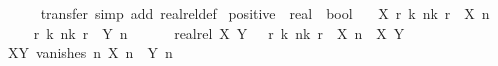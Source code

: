 \begin{isabellebody}
\ \ \ \ \isamarkupfalse%
\ transfer\ {\isacharparenleft}{\kern0pt}simp\ add{\isacharcolon}{\kern0pt}\ realrel{\isacharunderscore}{\kern0pt}def{\isacharparenright}{\kern0pt}\isanewline
{}\isamarkupfalse%
%
\endisatagproof
{\isafoldproof}%
%
\isadelimproof
\isanewline
%
\endisadelimproof
\isanewline
{}\isamarkupfalse%
%
\isadelimdocument
%
\endisadelimdocument
%
\isatagdocument
%
\isamarkuptrue%
%
\endisatagdocument
{\isafolddocument}%
%
\isadelimdocument
%
\endisadelimdocument
{}\isamarkupfalse%
\ positive\ {\isacharcolon}{\kern0pt}{\isacharcolon}{\kern0pt}\ {\isachardoublequoteopen}real\ {\isasymRightarrow}\ bool{\isachardoublequoteclose}\isanewline
\ \ \ {\isachardoublequoteopen}{\isasymlambda}X{\isachardot}{\kern0pt}\ {\isasymexists}r{\isachargreater}{\kern0pt}{}{\isachardot}{\kern0pt}\ {\isasymexists}k{\isachardot}{\kern0pt}\ {\isasymforall}n{\isasymge}k{\isachardot}{\kern0pt}\ r\ {\isacharless}{\kern0pt}\ X\ n{\isachardoublequoteclose}\isanewline
%
\isadelimproof
%
\endisadelimproof
%
\isatagproof
{}\isamarkupfalse%
\ {\isacharminus}{\kern0pt}\isanewline
\ \ \isamarkupfalse%
\ {}{\isacharcolon}{\kern0pt}\ {\isachardoublequoteopen}{\isasymexists}r{\isachargreater}{\kern0pt}{}{\isachardot}{\kern0pt}\ {\isasymexists}k{\isachardot}{\kern0pt}\ {\isasymforall}n{\isasymge}k{\isachardot}{\kern0pt}\ r\ {\isacharless}{\kern0pt}\ Y\ n{\isachardoublequoteclose}\isanewline
\ \ \ \ \ {\isacharasterisk}{\kern0pt}{\isacharcolon}{\kern0pt}\ {\isachardoublequoteopen}realrel\ X\ Y{\isachardoublequoteclose}\ \ {\isacharasterisk}{\kern0pt}{\isacharasterisk}{\kern0pt}{\isacharcolon}{\kern0pt}\ {\isachardoublequoteopen}{\isasymexists}r{\isachargreater}{\kern0pt}{}{\isachardot}{\kern0pt}\ {\isasymexists}k{\isachardot}{\kern0pt}\ {\isasymforall}n{\isasymge}k{\isachardot}{\kern0pt}\ r\ {\isacharless}{\kern0pt}\ X\ n{\isachardoublequoteclose}\ \ X\ Y\isanewline
\ \ \isamarkupfalse%
\ {\isacharminus}{\kern0pt}\isanewline
\ \ \ \ \isamarkupfalse%
\ {\isacharasterisk}{\kern0pt}\ \isamarkupfalse%
\ XY{\isacharcolon}{\kern0pt}\ {\isachardoublequoteopen}vanishes\ {\isacharparenleft}{\kern0pt}{\isasymlambda}n{\isachardot}{\kern0pt}\ X\ n\ {\isacharminus}{\kern0pt}\ Y\ n{\isacharparenright}{\kern0pt}{\isachardoublequoteclose}\isanewline
\ \ \ \ \ \ \isamarkupfalse%

\end{isabellebody}

